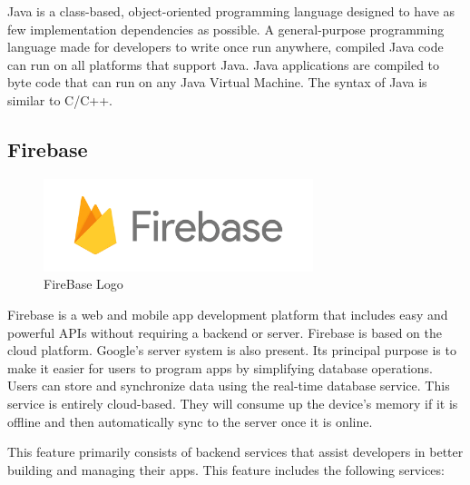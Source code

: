 Java is a class-based, object-oriented programming language designed to have as few implementation dependencies as possible. A general-purpose programming language made for developers to write once run anywhere, compiled Java code can run on all platforms that support Java. Java applications are compiled to byte code that can run on any Java Virtual Machine. The syntax of Java is similar to C/C++.


\subsection{Firebase}

\begin{figure}[H]
	\centering
	\includegraphics[width=0.7\textwidth]{img/technology/firebase.png}
	\caption{FireBase Logo}
	\label{fig:FireBaseLogo}
\end{figure}

Firebase is a web and mobile app development platform that includes easy and powerful APIs without requiring a backend or server. Firebase is based on the cloud platform. Google's server system is also present. Its principal purpose is to make it easier for users to program apps by simplifying database operations. Users can store and synchronize data using the real-time database service. This service is entirely cloud-based. They will consume up the device's memory if it is offline and then automatically sync to the server once it is online.

This feature primarily consists of backend services that assist developers in better building and managing their apps. This feature includes the following services:


